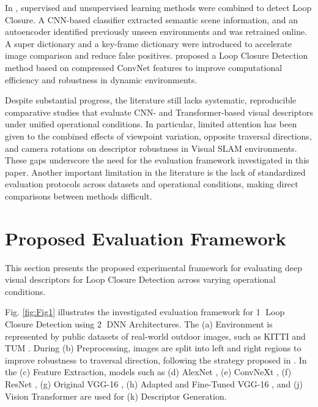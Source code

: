 \documentclass{ieeeaccess}
\newcommand{\circled}[1]{\textcircled{\scriptsize #1}}
\begin{document}
In \cite{Memon2020DeepLoopClosure}, supervised and unsupervised learning methods were combined to detect Loop Closure. A CNN-based classifier extracted semantic scene information, and an autoencoder identified previously unseen environments and was retrained online. A super dictionary and a key-frame dictionary were introduced to accelerate image comparison and reduce false positives. \cite{jiang2024compressed} proposed a Loop Closure Detection method based on compressed ConvNet features to improve computational efficiency and robustness in dynamic environments.

Despite substantial progress, the literature still lacks systematic, reproducible comparative studies that evaluate CNN- and Transformer-based visual descriptors under unified operational conditions. In particular, limited attention has been given to the combined effects of viewpoint variation, opposite traversal directions, and camera rotations on descriptor robustness in Visual SLAM environments. These gaps underscore the need for the evaluation framework investigated in this paper. Another important limitation in the literature is the lack of standardized evaluation protocols across datasets and operational conditions, making direct comparisons between methods difficult.

\section{Proposed Evaluation Framework}
\label{sec:Loop}

This section presents the proposed experimental framework for evaluating deep visual descriptors for Loop Closure Detection across varying operational conditions.

Fig. \ref{fig:Fig1} illustrates the investigated evaluation framework for \circled{1} Loop Closure Detection using \circled{2} DNN Architectures. The (a) Environment is represented by public datasets of real-world outdoor images, such as KITTI \cite{Geiger2013KITTI} and TUM \cite{Sturm2012RGBDSLAMBenchmark}. During (b) Preprocessing, images are split into left and right regions to improve robustness to traversal direction, following the strategy proposed in \cite{Garg2018DontLookBack}. In the (c) Feature Extraction, models such as (d) AlexNet \cite{Krizhevsky2017AlexNetCACM}, (e) ConvNeXt \cite{Liu2022ConvNeXt}, (f) ResNet \cite{He2016ResNet}, (g) Original VGG-16 \cite{Simonyan2015VGG}, (h) Adapted and Fine-Tuned VGG-16 \cite{Iegawa2023LoopClosureCNN}, and (j) Vision Transformer \cite{Dosovitskiy2021ViT} are used for (k) Descriptor Generation.
\end{document}
